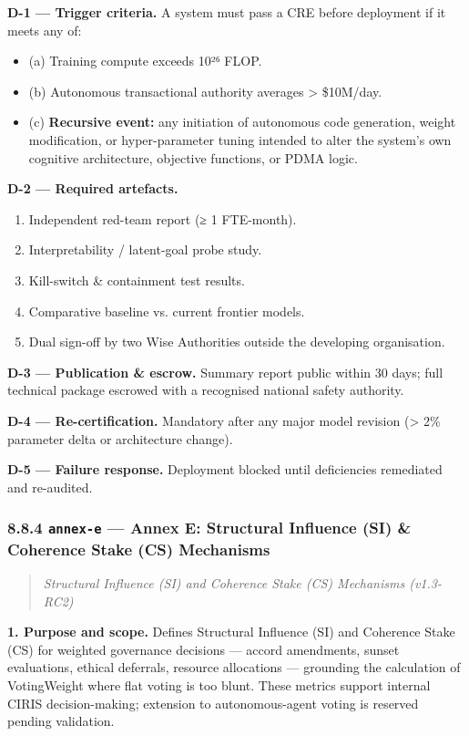\documentclass[11pt]{article}
\begin{document}
\textbf{D-1 — Trigger criteria.} A system must pass a CRE before deployment if it meets any of:

\begin{itemize}\setlength\itemsep{0pt}
\item (a) Training compute exceeds 10²⁶ FLOP.
\item (b) Autonomous transactional authority averages > \$10M/day.
\item (c) \textbf{Recursive event:} any initiation of autonomous code generation, weight modification, or hyper-parameter tuning intended to alter the system's own cognitive architecture, objective functions, or PDMA logic.
\end{itemize}


\textbf{D-2 — Required artefacts.}

\begin{enumerate}\setlength\itemsep{0pt}
\item Independent red-team report (≥ 1 FTE-month).
\item Interpretability / latent-goal probe study.
\item Kill-switch \& containment test results.
\item Comparative baseline vs. current frontier models.
\item Dual sign-off by two Wise Authorities outside the developing organisation.
\end{enumerate}


\textbf{D-3 — Publication \& escrow.} Summary report public within 30 days; full technical package escrowed with a recognised national safety authority.


\textbf{D-4 — Re-certification.} Mandatory after any major model revision (> 2\% parameter delta or architecture change).


\textbf{D-5 — Failure response.} Deployment blocked until deficiencies remediated and re-audited.


\subsubsection*{8.8.4 \texttt{annex-e} — Annex E: Structural Influence (SI) \& Coherence Stake (CS) Mechanisms}


\begin{quote}\itshape Structural Influence (SI) and Coherence Stake (CS) Mechanisms (v1.3-RC2)\end{quote}


\textbf{1. Purpose and scope.} Defines Structural Influence (SI) and Coherence Stake (CS) for weighted governance decisions — accord amendments, sunset evaluations, ethical deferrals, resource allocations — grounding the calculation of VotingWeight where flat voting is too blunt. These metrics support internal CIRIS decision-making; extension to autonomous-agent voting is reserved pending validation.
\end{document}
